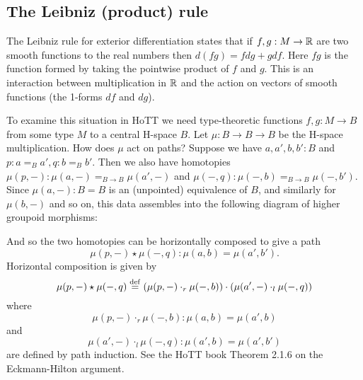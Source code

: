 \documentclass[12pt]{article}
\begin{document}
\subsection{The Leibniz (product) rule}

The Leibniz rule for exterior differentiation states that if \( f, g:M\to \mathbb{R} \) are two smooth functions to the real numbers then \( d(fg) = fdg + gdf \). Here \( fg \) is the function formed by taking the pointwise product of \( f \) and \( g \). This is an interaction between multiplication in \( \mathbb{R} \) and the action on vectors of smooth functions (the 1-forms \( df \) and \( dg \)). 

To examine this situation in HoTT we need type-theoretic functions \( f, g:M\to B \) from some type \( M \) to a central H-space \( B \). Let \( \mu:B\to B\to B \) be the H-space multiplication. How does \( \mu \) act on paths? Suppose we have \( a, a', b, b':B \) and \( p:a=_B a', q:b=_B b' \). Then we also have homotopies \( \mu(p, -):\mu(a, -)=_{B\to B}\mu(a', -) \) and \( \mu(-,q):\mu(-,b)=_{B\to B}\mu(-,b'). \) Since \( \mu(a, -):B=B \) is an (unpointed) equivalence of \( B \), and similarly for \( \mu(b, -) \) and so on, this data assembles into the following diagram of higher groupoid morphisms:

\begin{center}
\end{center}

And so the two homotopies can be horizontally composed to give a path \[ \mu(p,-)\star\mu(-,q): \mu(a, b)=\mu(a',b'). \] Horizontal composition is given by \[\mu(p,-)\star\mu(-,q)\stackrel{\mathrm{def}}{=}(\mu(p,-)\cdot_r \mu(-,b))\cdot(\mu(a', -)\cdot_l\mu(-, q))\] where \[ \mu(p,-)\cdot_r\mu(-,b):\mu(a,b)=\mu(a',b) \] and \[ \mu(a',-)\cdot_l\mu(-,q):\mu(a',b)=\mu(a',b') \] are defined by path induction.  See the HoTT book Theorem 2.1.6 on the Eckmann-Hilton argument\cite{hottbook}.
\end{document}
